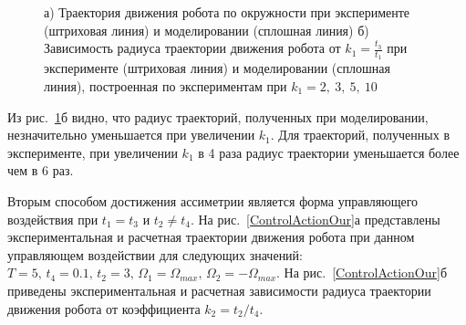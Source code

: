 \begin{figure}[!ht]
	\begin{minipage}[h]{0.25\linewidth}
	\end{minipage}
	\hfill
	\begin{minipage}[h]{0.6\linewidth}
	\end{minipage}
	\caption{а) Траектория движения робота по окружности при эксперименте (штриховая линия) и моделировании (сплошная линия)  б) Зависимость радиуса траектории движения робота от $k_1 = \frac{t_3}{t_1}$ при эксперименте (штриховая линия) и моделировании (сплошная линия), построенная по экспериментам при $k_1 = 2,\ 3,\ 5,\ 10$ }
	\label{CircleTrajectory}
\end{figure}


Из рис.~\ref{CircleTrajectory}б видно, что радиус траекторий, полученных при моделировании, незначительно уменьшается при увеличении $k_1$. Для траекторий, полученных в эксперименте, при увеличении $k_1$ в 4 раза радиус траектории уменьшается более чем в 6 раз.

Вторым способом достижения ассиметрии является форма управляющего воздействия при $t_1 = t_3$ и $t_2 \neq t_4$. На рис.~\ref{ControlActionOur}а представлены экспериментальная и расчетная траектории движения робота при данном управляющем воздействии для следующих значений: $ T=5,\, t_4 = 0.1,\, t_2 = 3,\, \Omega_1 = \Omega_{max},\, \Omega_2 = -\Omega_{max} $. На рис.~\ref{ControlActionOur}б приведены экспериментальная и расчетная зависимости радиуса траектории движения робота от коэффициента $k_2 = t_2 / t_4$. 

